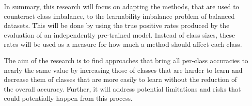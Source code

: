 \documentclass[journal]{IEEEtran}
\begin{document}
In summary, this research will focus on adapting the methods, that are used to counteract class imbalance, to the learnability imbalance problem of balanced datasets.
This will be done by using the true positive rates produced by the evaluation of an independently pre-trained model.
Instead of class sizes, these rates will be used as a measure for how much a method should affect each class.

The aim of the research is to find approaches that bring all per-class accuracies to nearly the same value by increasing those of classes that are harder to learn 
and decrease them of classes that are more easily to learn without the reduction of the overall accuracy.
Further, it will address potential limitations and risks that could potentially happen from this process.
\end{document}
